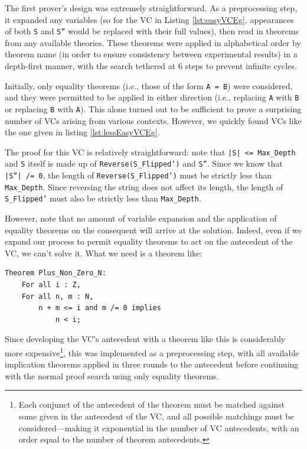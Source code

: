 The first prover's design was extremely straightforward.  As a preprocessing step, it expanded any variables (so for the VC in Listing \ref{lst:easyVCEg}, appearances of both \texttt{S} and \texttt{S''} would be replaced with their full values), then read in theorems from any available theories.  These theorems were applied in alphabetical order by theorem name (in order to ensure consistency between experimental results) in a depth-first manner, with the search tethered at 6 steps to prevent infinite cycles.

Initially, only equality theorems (i.e., those of the form \texttt{A = B}) were considered, and they were permitted to be applied in either direction (i.e., replacing \texttt{A} with \texttt{B} or replacing \texttt{B} with \texttt{A}).  This alone turned out to be sufficient to prove a surprising number of VCs arising from various contexts.  However, we quickly found VCs like the one given in listing \ref{lst:lessEasyVCEg}.



The proof for this VC is relatively straightforward: note that \texttt{|S| <= Max\_Depth} and \texttt{S} itself is made up of \texttt{Reverse(S\_Flipped')} and \texttt{S''}.  Since we know that \texttt{|S''| /= 0}, the length of \texttt{Reverse(S\_Flipped')} must be strictly less than \texttt{Max\_Depth}.  Since reversing the string does not affect its length, the length of \texttt{S\_Flipped'} must also be strictly less than \texttt{Max\_Depth}.

However, note that no amount of variable expansion and the application of equality theorems on the consequent will arrive at the solution.  Indeed, even if we expand our process to permit equality theorems to act on the antecedent of the VC, we can't solve it.  What we need is a theorem like:

\begin{lstlisting}
Theorem Plus_Non_Zero_N:
    For all i : Z,
    For all n, m : N,
        n + m <= i and m /= 0 implies
            n < i;
\end{lstlisting}

Since developing the VC's antecedent with a theorem like this is considerably more expensive\footnote{Each conjunct of the antecedent of the theorem must be matched against some given in the antecedent of the VC, and all possible matchings must be considered---making it exponential in the number of VC antecedents, with an order equal to the number of theorem antecedents.}, this was implemented as a preprocessing step, with all available implication theorems applied in three rounds to the antecedent before continuing with the normal proof search using only equality theorems.

